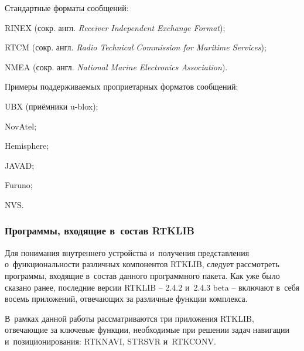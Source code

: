 Стандартные форматы сообщений:
\begin{dashitemize}
  \item RINEX (сокр. англ. \emph{Receiver Independent Exchange Format});
  \item RTCM (сокр. англ. \emph{Radio Technical Commission for Maritime Services});
  \item NMEA (сокр. англ. \emph{National Marine Electronics Association}).
\end{dashitemize}

Примеры поддерживаемых проприетарных форматов сообщений:
\begin{dashitemize}
  \item UBX (приёмники u-blox);
  \item NovAtel;
  \item Hemisphere;
  \item JAVAD;
  \item Furuno;
  \item NVS.
\end{dashitemize}

\subsubsection{Программы, входящие в~состав RTKLIB}

Для понимания внутреннего устройства и~получения представления о~функциональности различных компонентов RTKLIB, следует рассмотреть программы, входящие в~состав данного программного пакета. Как уже было сказано ранее, последние версии RTKLIB -- 2.4.2 и~2.4.3 beta -- включают в~себя восемь приложений, отвечающих за различные функции комплекса. \par

В~рамках данной работы рассматриваются три приложения RTKLIB, отвечающие за ключевые функции, необходимые при решении задач навигации и~позиционирования: RTKNAVI, STRSVR и~RTKCONV.

